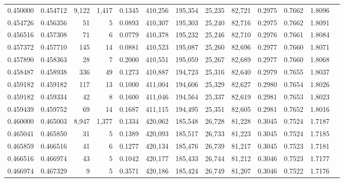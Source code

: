 \begin{tabular}{rrrrrrrrrrrrr}
0.450000 & 0.454712 &  9,122 & 1,417 &                                     0.1345 & 410,256 & 195,354 &  25,235 &  82,721 & 0.2975 & 0.7662 & 1.8096 \\
0.454726 & 0.456356 &     51 &     5 &                                     0.0893 & 410,307 & 195,303 &  25,240 &  82,716 & 0.2975 & 0.7662 & 1.8091 \\
0.456516 & 0.457308 &     71 &     6 &                                     0.0779 & 410,378 & 195,232 &  25,246 &  82,710 & 0.2976 & 0.7661 & 1.8084 \\
0.457372 & 0.457710 &    145 &    14 &                                     0.0881 & 410,523 & 195,087 &  25,260 &  82,696 & 0.2977 & 0.7660 & 1.8071 \\
0.457890 & 0.458363 &     28 &     7 &                                     0.2000 & 410,551 & 195,059 &  25,267 &  82,689 & 0.2977 & 0.7660 & 1.8068 \\
0.458487 & 0.458938 &    336 &    49 &                                     0.1273 & 410,887 & 194,723 &  25,316 &  82,640 & 0.2979 & 0.7655 & 1.8037 \\
0.459182 & 0.459182 &    117 &    13 &                                     0.1000 & 411,004 & 194,606 &  25,329 &  82,627 & 0.2980 & 0.7654 & 1.8026 \\
0.459182 & 0.459334 &     42 &     8 &                                     0.1600 & 411,046 & 194,564 &  25,337 &  82,619 & 0.2981 & 0.7653 & 1.8023 \\
0.459439 & 0.459752 &     69 &    14 &                                     0.1687 & 411,115 & 194,495 &  25,351 &  82,605 & 0.2981 & 0.7652 & 1.8016 \\
0.460000 & 0.465003 &  8,947 & 1,377 &                                     0.1334 & 420,062 & 185,548 &  26,728 &  81,228 & 0.3045 & 0.7524 & 1.7187 \\
0.465041 & 0.465850 &     31 &     5 &                                     0.1389 & 420,093 & 185,517 &  26,733 &  81,223 & 0.3045 & 0.7524 & 1.7185 \\
0.465859 & 0.466516 &     41 &     6 &                                     0.1277 & 420,134 & 185,476 &  26,739 &  81,217 & 0.3045 & 0.7523 & 1.7181 \\
0.466516 & 0.466974 &     43 &     5 &                                     0.1042 & 420,177 & 185,433 &  26,744 &  81,212 & 0.3046 & 0.7523 & 1.7177 \\
0.466974 & 0.467329 &      9 &     5 &                                     0.3571 & 420,186 & 185,424 &  26,749 &  81,207 & 0.3046 & 0.7522 & 1.7176 \\

\end{tabular}
